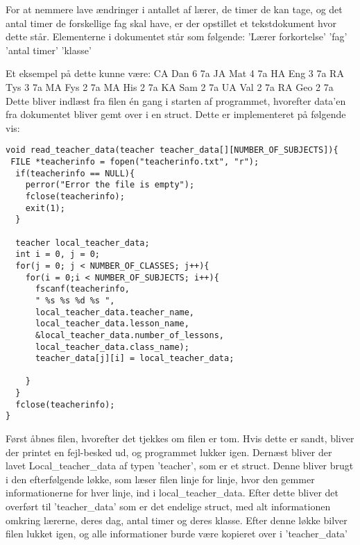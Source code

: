 For at nemmere lave ændringer i antallet af lærer, de timer de kan tage, og det antal timer de forskellige fag skal have, er der opstillet et tekstdokument hvor dette står. 
Elementerne i dokumentet står som følgende:
’Lærer forkortelse’ ’fag’ ’antal timer’ ’klasse’

Et eksempel på dette kunne være:
    CA Dan 6 7a
    JA Mat 4 7a
    HA Eng 3 7a
    RA Tys 3 7a
    MA Fys 2 7a
    MA His 2 7a
    KA Sam 2 7a
    UA Val 2 7a
    RA Geo 2 7a
Dette bliver indlæst fra filen én gang i starten af programmet, hvorefter data’en fra dokumentet bliver gemt over i en struct.
Dette er implementeret på følgende vis:
\begin{lstlisting}
void read_teacher_data(teacher teacher_data[][NUMBER_OF_SUBJECTS]){
 FILE *teacherinfo = fopen("teacherinfo.txt", "r");
  if(teacherinfo == NULL){
    perror("Error the file is empty");
    fclose(teacherinfo);
    exit(1);
  }

  teacher local_teacher_data;
  int i = 0, j = 0;
  for(j = 0; j < NUMBER_OF_CLASSES; j++){
    for(i = 0;i < NUMBER_OF_SUBJECTS; i++){
      fscanf(teacherinfo,
      " %s %s %d %s ",
      local_teacher_data.teacher_name, 
      local_teacher_data.lesson_name, 
      &local_teacher_data.number_of_lessons, 
      local_teacher_data.class_name);
      teacher_data[j][i] = local_teacher_data; 
  
    } 
  }  
  fclose(teacherinfo);
}
\end{lstlisting}
Først åbnes filen, hvorefter det tjekkes om filen er tom. Hvis dette er sandt, bliver der printet en fejl-besked ud, og programmet lukker igen.
Dernæst bliver der lavet Local\_teacher\_data af typen ’teacher’, som er et struct. Denne bliver brugt i den efterfølgende løkke, som læser filen linje for linje, hvor den gemmer informationerne for hver linje, ind i local\_teacher\_data. Efter dette bliver det overført til ’teacher\_data’ som er det endelige struct, med alt informationen omkring lærerne, deres dag, antal timer og deres klasse. 
Efter denne løkke bilver filen lukket igen, og alle informationer burde være kopieret over i ’teacher\_data’